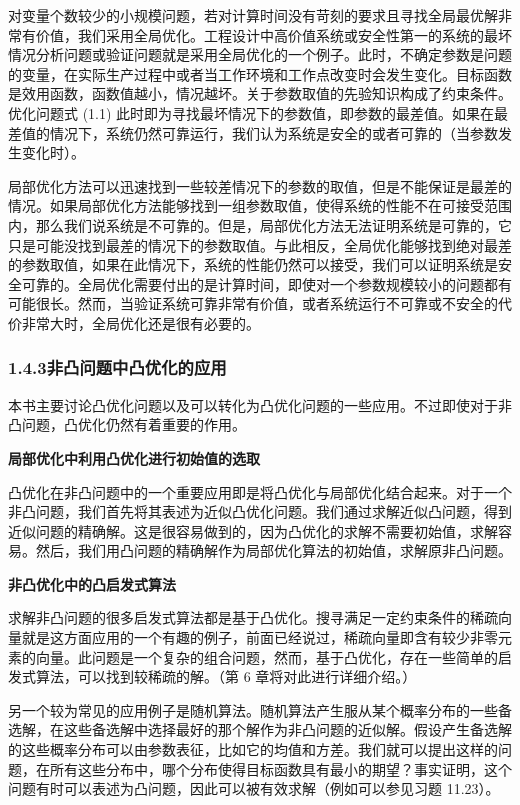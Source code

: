 \documentclass[UTF8, 12pt, fontset=fandol, oneside]{ctexart}
\begin{document}
对变量个数较少的小规模问题，若对计算时间没有苛刻的要求且寻找全局最优解非常有价值，我们采用全局优化。工程设计中高价值系统或安全性第一的系统的最坏情况分析问题或验证问题就是采用全局优化的一个例子。此时，不确定参数是问题的变量，在实际生产过程中或者当工作环境和工作点改变时会发生变化。目标函数是效用函数，函数值越小，情况越坏。关于参数取值的先验知识构成了约束条件。优化问题式 (1.1) 此时即为寻找最坏情况下的参数值，即参数的最差值。如果在最差值的情况下，系统仍然可靠运行，我们认为系统是安全的或者可靠的（当参数发生变化时）。

局部优化方法可以迅速找到一些较差情况下的参数的取值，但是不能保证是最差的情况。如果局部优化方法能够找到一组参数取值，使得系统的性能不在可接受范围内，那么我们说系统是不可靠的。但是，局部优化方法无法证明系统是可靠的，它只是可能没找到最差的情况下的参数取值。与此相反，全局优化能够找到绝对最差的参数取值，如果在此情况下，系统的性能仍然可以接受，我们可以证明系统是安全可靠的。全局优化需要付出的是计算时间，即使对一个参数规模较小的问题都有可能很长。然而，当验证系统可靠非常有价值，或者系统运行不可靠或不安全的代价非常大时，全局优化还是很有必要的。

\subsubsection*{1.4.3\quad 非凸问题中凸优化的应用}

本书主要讨论凸优化问题以及可以转化为凸优化问题的一些应用。不过即使对于非凸问题，凸优化仍然有着重要的作用。

\noindent\textbf{局部优化中利用凸优化进行初始值的选取}

凸优化在非凸问题中的一个重要应用即是将凸优化与局部优化结合起来。对于一个非凸问题，我们首先将其表述为近似凸优化问题。我们通过求解近似凸问题，得到近似问题的精确解。这是很容易做到的，因为凸优化的求解不需要初始值，求解容易。然后，我们用凸问题的精确解作为局部优化算法的初始值，求解原非凸问题。

\noindent\textbf{非凸优化中的凸启发式算法}

求解非凸问题的很多启发式算法都是基于凸优化。搜寻满足一定约束条件的稀疏向量就是这方面应用的一个有趣的例子，前面已经说过，稀疏向量即含有较少非零元素的向量。此问题是一个复杂的组合问题，然而，基于凸优化，存在一些简单的启发式算法，可以找到较稀疏的解。（第 6 章将对此进行详细介绍。）

另一个较为常见的应用例子是随机算法。随机算法产生服从某个概率分布的一些备选解，在这些备选解中选择最好的那个解作为非凸问题的近似解。假设产生备选解的这些概率分布可以由参数表征，比如它的均值和方差。我们就可以提出这样的问题，在所有这些分布中，哪个分布使得目标函数具有最小的期望？事实证明，这个问题有时可以表述为凸问题，因此可以被有效求解（例如可以参见习题 11.23）。
\end{document}
